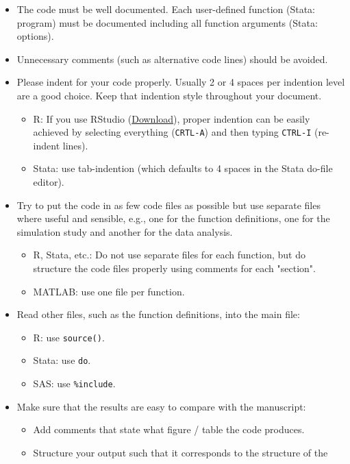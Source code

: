 \documentclass[12pt,a4paper]{article}
\begin{document}
\begin{itemize}
\item The code {must} be well documented. Each user-defined function
  (\textsf{Stata}: program) {must} be documented including all function
  arguments (\textsf{Stata}: options).
\item Unnecessary comments (such as alternative code lines) {should} be
  avoided.
\item Please indent for your code properly. Usually 2 or 4 spaces per indention
  level are a good choice. Keep that indention style throughout your document.
  \begin{itemize}
  \item \textsf{R}: If you use RStudio
    (\href{http://www.rstudio.com/products/rstudio/download/}{Download}), proper
    indention can be easily achieved by selecting everything (\texttt{CRTL-A})
    and then typing \texttt{CTRL-I} (re-indent lines).
  \item \textsf{Stata}: use tab-indention (which defaults to 4 spaces in the
    \textsf{Stata} do-file editor).
  \end{itemize}
\item Try to put the code in as few code files as possible but use separate
  files where useful and sensible, e.g., one for the function definitions, one
  for the simulation study and another for the data analysis.
  \begin{itemize}
  \item \textsf{R}, \textsf{Stata}, etc.: Do not use separate files for each function,
    but do structure the code files properly using comments for each "section".
  \item \textsf{MATLAB}: use one file per function.
  \end{itemize}
\item Read other files, such as the function definitions, into the main file:
  \begin{itemize}
  \item \textsf{R}: use \texttt{source()}.
  \item \textsf{Stata}: use \texttt{do}.
  \item \textsf{SAS}: use \texttt{\%include}.
  \end{itemize}
\item Make sure that the results are easy to compare with the manuscript:
  \begin{itemize}
  \item Add comments that state what figure / table the code produces.
  \item Structure your output such that it corresponds to the structure of the

\end{itemize}
\end{itemize}
\end{document}
